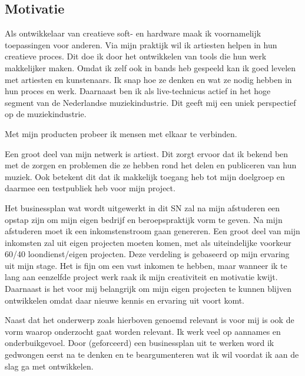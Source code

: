 \subsection{Motivatie}
Als ontwikkelaar van creatieve soft- en hardware maak ik voornamelijk toepassingen voor anderen. Via mijn praktijk wil ik artiesten helpen in hun creatieve proces. Dit doe ik door het ontwikkelen van tools die hun werk makkelijker maken. Omdat ik zelf ook in bands heb gespeeld kan ik goed levelen met artiesten en kunstenaars. Ik snap hoe ze denken en wat ze nodig hebben in hun proces en werk. Daarnaast ben ik als live-technicus actief in het hoge segment van de Nederlandse muziekindustrie. Dit geeft mij een uniek perspectief op de muziekindustrie.

Met mijn producten probeer ik mensen met elkaar te verbinden.

Een groot deel van mijn netwerk is artiest. Dit zorgt ervoor dat ik bekend ben met de zorgen en problemen die ze hebben rond het delen en publiceren van hun muziek. Ook betekent dit dat ik makkelijk toegang heb tot mijn doelgroep en daarmee een testpubliek heb voor mijn project.

Het businessplan wat wordt uitgewerkt in dit SN zal na mijn afstuderen een opstap zijn om mijn eigen bedrijf en beroepspraktijk vorm te geven. Na mijn afstuderen moet ik een inkomstenstroom gaan genereren. Een groot deel van mijn inkomsten zal uit eigen projecten moeten komen, met als uiteindelijke voorkeur 60/40 loondienst/eigen projecten. Deze verdeling is gebaseerd op mijn ervaring uit mijn stage. Het is fijn om een vast inkomen te hebben, maar wanneer ik te lang aan eenzelfde project werk raak ik mijn creativiteit en motivatie kwijt. Daarnaast is het voor mij belangrijk om mijn eigen projecten te kunnen blijven ontwikkelen omdat daar nieuwe kennis en ervaring uit voort komt.

Naast dat het onderwerp zoals hierboven genoemd relevant is voor mij is ook de vorm waarop onderzocht gaat worden relevant. Ik werk veel op aannames en onderbuikgevoel. Door (geforceerd) een businessplan uit te werken word ik gedwongen eerst na te denken en te beargumenteren wat ik wil voordat ik aan de slag ga met ontwikkelen.

